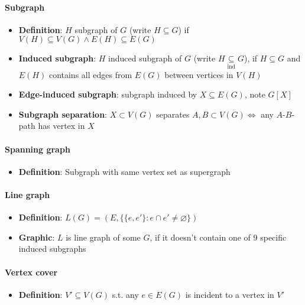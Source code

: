 \paragraph{Subgraph}
\begin{itemize}
  \item \textbf{Definition}: $ H $ subgraph of $ G $ (write $ H \subseteq G $) if $ V(H) \subseteq V(G) \wedge E(H) \subseteq E(G) $
  \item \textbf{Induced subgraph}: $ H $ induced subgraph of $ G $ (write $ H \underset{\text{ind}}{\subseteq} G $), if $ H \subseteq G $ and $ E(H) $ contains all edges from $ E(G) $ between vertices in $ V(H) $
  \item \textbf{Edge-induced subgraph}: subgraph induced by $ X \subseteq E(G) $, note $ G[X] $
  \item \textbf{Subgraph separation}: $ X \subset V(G) $ separates $ A,B \subset V(G) \Leftrightarrow $ any $ A $-$ B $-path has vertex in $ X $
\end{itemize}

\paragraph{Spanning graph}
\begin{itemize}
  \item \textbf{Definition}: Subgraph with same vertex set as supergraph 
\end{itemize}

\paragraph{Line graph}
\begin{itemize}
  \item \textbf{Definition}: $ L(G) = (E, \{ \{ e, e' \} : e \cap e' \neq \varnothing \}) $ 
  \item \textbf{Graphic}: $ L $ is line graph of some $ G $, if it doesn't contain one of 9 specific induced subgraphs
\end{itemize}

\paragraph{Vertex cover}
\begin{itemize}
  \item \textbf{Definition}: $ V' \subseteq V(G) $ s.t. any $ e \in E(G) $ is incident to a vertex in $ V' $ 
\end{itemize}

